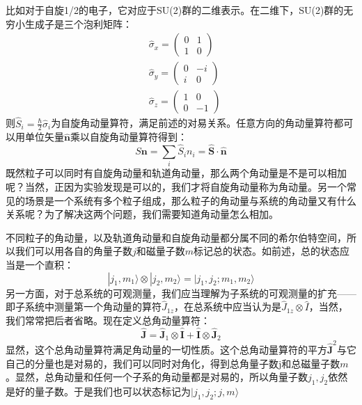 \documentclass{ctexart}
\begin{document}
比如对于自旋1/2的电子，它对应于SU(2)群的二维表示。在二维下，SU(2)群的无穷小生成子是三个泡利矩阵：
\begin{align}
&\hat{\sigma}_x=\begin{pmatrix}
0 & 1 \\
1 & 0 
\end{pmatrix} \\
&\hat{\sigma}_y=\begin{pmatrix}
0 & -i \\
i & 0 
\end{pmatrix} \\
&\hat{\sigma}_z=\begin{pmatrix}
1 & 0 \\
0 & -1 
\end{pmatrix}
\end{align}
则$\hat{S}_i=\frac{\hbar}{2}\hat{\sigma}_i$为自旋角动量算符，满足前述的对易关系。任意方向的角动量算符都可以用单位矢量$\hat{\bm{n}}$乘以自旋角动量算符得到：
\begin{equation}
\hat{S\bm{n}}=\sum_i\hat{S}_in_i=\hat{\bm{S}}\cdot\hat{\bm{n}}
\end{equation}
既然粒子可以同时有自旋角动量和轨道角动量，那么两个角动量是不是可以相加呢？当然，正因为实验发现是可以的，我们才将自旋角动量称为角动量。另一个常见的场景是一个系统有多个粒子组成，那么粒子的角动量与系统的角动量又有什么关系呢？为了解决这两个问题，我们需要知道角动量怎么相加。

不同粒子的角动量，以及轨道角动量和自旋角动量都分属不同的希尔伯特空间，所以我们可以用各自的角量子数$j$和磁量子数$m$标记总的状态。如前述，总的状态应当是一个直积：
\begin{equation}
|j_1,m_1\rangle\otimes|j_2,m_2\rangle=|j_1,j_2;m_1,m_2\rangle
\end{equation}
另一方面，对于总系统的可观测量，我们应当理解为子系统的可观测量的扩充——即子系统中测量第一个角动量的算符$\hat{J}_{1z}$，在总系统中应当认为是$\hat{J}_{1z}\otimes\hat{I}$，当然，我们常常把后者省略。现在定义总角动量算符：
\begin{equation}
\hat{\bm{J}}=\hat{\bm{J}}_1\otimes\hat{\bm{I}}+\hat{\bm{I}}\otimes\hat{\bm{J}}_2
\end{equation}
显然，这个总角动量算符满足角动量的一切性质。这个总角动量算符的平方$\hat{\bm{J}}^2$与它自己的分量也是对易的，我们可以同时对角化，得到总角量子数j和总磁量子数$m$。显然，总角动量和任何一个子系的角动量都是对易的，所以角量子数$j_1,j_2$依然是好的量子数。于是我们也可以状态标记为$|j_1,j_2;j,m\rangle$
\end{document}
